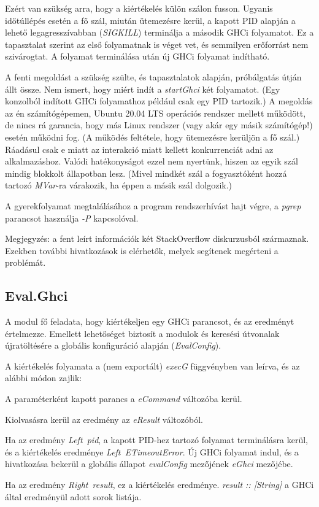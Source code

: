 Ezért van szükség arra, hogy a kiértékelés külön szálon fusson. Ugyanis időtúllépés esetén a fő szál, miután ütemezésre kerül, a kapott PID alapján a lehető legagresszívabban (\textit{SIGKILL}) terminálja a második GHCi folyamatot. Ez a tapasztalat szerint az első folyamatnak is véget vet, és semmilyen erőforrást nem szivárogtat. A folyamat terminálása után új GHCi folyamat indítható.

A fenti megoldást a szükség szülte, és tapasztalatok alapján, próbálgatás útján állt össze. Nem ismert, hogy miért indít a \textit{startGhci} két folyamatot. (Egy konzolból indított GHCi folyamathoz például csak egy PID tartozik.) A megoldás az én számítógépemen, Ubuntu 20.04 LTS operációs rendszer mellett működött, de nincs rá garancia, hogy más Linux rendszer (vagy akár egy másik számítógép!) esetén működni fog. (A működés feltétele, hogy ütemezésre kerüljön a fő szál.) Ráadásul csak e miatt az interakció miatt kellett konkurrenciát adni az alkalmazáshoz. Valódi hatékonyságot ezzel nem nyertünk, hiszen az egyik szál mindig blokkolt állapotban lesz. (Mivel mindkét szál a fogyasztóként hozzá tartozó \textit{MVar}-ra várakozik, ha éppen a másik szál dolgozik.)

A gyerekfolyamat megtalálásához a program rendszerhívást hajt végre, a \textit{pgrep} parancsot használja \textit{-P} kapcsolóval.

Megjegyzés: a fent leírt információk két StackOverflow diskurzusból \cite{ghci_stackoverflow1} \cite{ghci_stackoverflow2} származnak. Ezekben további hivatkozások is elérhetők, melyek segítenek megérteni a problémát.

\subsection{Eval.Ghci}

A modul fő feladata, hogy kiértékeljen egy GHCi parancsot, és az eredményt értelmezze. Emellett lehetőséget biztosít a modulok és keresési útvonalak újratöltésére a globális konfiguráció alapján (\textit{EvalConfig}).

A kiértékelés folyamata a (nem exportált) \textit{execG} függvényben van leírva, és az alábbi módon zajlik:
\begin{compactenum}
	\item A paraméterként kapott parancs a \textit{eCommand} változóba kerül.
	\item Kiolvasásra kerül az eredmény az \textit{eResult} változóból.
	\item Ha az eredmény \textit{Left\ pid}, a kapott PID-hez tartozó folyamat terminálásra kerül, és a kiértékelés eredménye \textit{Left\ ETimeoutError}. Új GHCi folyamat indul, és a hivatkozása bekerül a globális állapot \textit{evalConfig} mezőjének \textit{eGhci} mezőjébe.
	\item Ha az eredmény \textit{Right\ result}, ez a kiértékelés eredménye. \textit{result :: [String]} a GHCi által eredményül adott sorok listája.
\end{compactenum}

